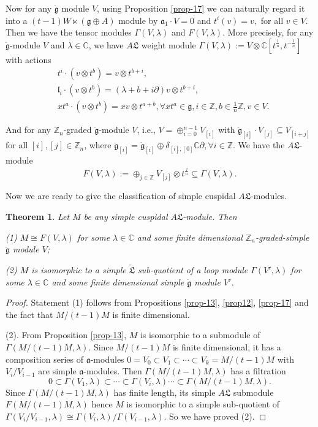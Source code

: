 \documentclass[1p]{elsarticle}
\numberwithin{equation}{section}
\def\fa{\mathfrak{a}}
\def\dg{\dot{\mathfrak{g}}}
\def\ddg{\ddot{\mathfrak{g}}}
\def\fg{\mathfrak{g}}
\def\fL{\mathfrak{L}}
\def\bC{\mathbb{C}}
\def\bZ{\mathbb{Z}}
\def\hg{\hat{\mathfrak{g}}}
\def\fl{\mathfrak{l}}
\newtheorem{theo}{{Theorem}}%
\begin{document}
Now for any  $\ddg$ module $V$, using Proposition \ref{prop-17} we can naturally regard it into  a $(t-1)W\ltimes (\fg\oplus A)$ module by $ \fa_{1}\cdot V=0$ and $t^i(v)=v,$ for all $v\in V$. Then we have the tensor modules $\Gamma(V,\lambda)$ and $F(V,\lambda)$. More precisely,
for any  $\ddg$-module $V$ and $\lambda\in \bC$, we have $A\fL$ weight module $\Gamma(V,\lambda):=V\otimes \bC[t^{\frac 1n},t^{-\frac 1n}]$ with actions
\begin{align}
&t^i\cdot(v\otimes t^b)=v\otimes t^{b+i},\\
&\fl_i\cdot(v\otimes t^b)=(\lambda+b+i\partial )v\otimes t^{b+i},\\
&xt^a \cdot(v\otimes t^b)=xv\otimes t^{a+b}, \forall xt^a\in \fg, i\in \bZ, b\in \frac 1n \bZ, v\in V.
\end{align}


And for any $\bZ_n$-graded $\ddg$-module $V$, i.e., $V=\oplus_{i=0}^{n-1} V_{[i]}$ with $\ddg_{[i]}\cdot V_{[j]}\subseteq V_{[i+j]}$ for all $[i],[j]\in \bZ_n$, where $\ddg_{[i]}=\dg_{[i]}\oplus \delta_{[i],[0]} \bC \partial,\forall i\in \bZ$. We have the $A\fL$-module
\begin{equation}F(V,\lambda):=\oplus_{j\in \bZ} V_{[j]}\otimes t^{\frac jn}\subseteq \Gamma(V,\lambda).\end{equation}


Now we are ready to give the classification of simple cuspidal $A\fL$-modules.

\begin{theo}\label{AL}Let $M$ be any simple cuspidal $A\fL$-module. Then

(1) $M\cong F(V,\lambda)$ for some $\lambda\in \bC$ and some finite dimensional $\bZ_n$-graded-simple $\ddg$ module $V$;

(2) $M$ is isomorphic to a simple $\tilde{\fL}$ sub-quotient of a loop module $\Gamma(V',\lambda)$ for some $\lambda\in \bC$ and some finite dimensional simple $\ddg$ module $V'$.
\end{theo}

\begin{proof} Statement (1) follows from Propositions \ref{prop-13}, \ref{prop12}, \ref{prop-17} and the fact that $M/(t-1)M$ is finite dimensional.
	
	(2). From Proposition \ref{prop-13}, $M$ is isomorphic to a submodule of $\Gamma(M/(t-1)M,\lambda)$. Since $M/(t-1)M$ is finite dimensional, it  has a composition series of $\fa$-modules  $0=V_0\subset V_1\subset\cdots \subset V_k=M/(t-1)M$ with $V_i/V_{i-1}$ are simple $\fa$-modules. Then $\Gamma(M/(t-1)M,\lambda)$ has a filtration  $$0\subset \Gamma(V_1,\lambda)\subset\cdots\subset \Gamma(V_i,\lambda)\cdots \subset \Gamma(M/(t-1)M,\lambda).$$ Since $\Gamma(M/(t-1)M,\lambda)$ has finite length, its simple $A\fL$ submodule $F(M/(t-1)M,\lambda)$ hence $M$ is isomorphic to a simple sub-quotient  of $\Gamma(V_i/V_{i-1},\lambda)\cong \Gamma(V_i,\lambda)/\Gamma(V_{i-1},\lambda)$. So we have proved (2). \end{proof}
\end{document}

